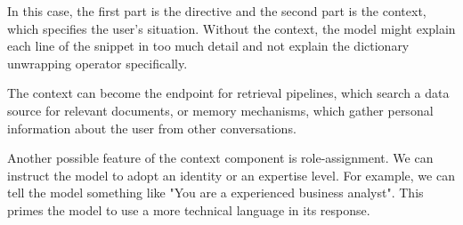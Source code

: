 In this case, the first part is the directive and the second part is the context, which specifies the user's situation.
Without the context, the model might explain each line of the snippet in too much detail and not explain the dictionary unwrapping operator specifically.

The context can become the endpoint for retrieval pipelines, which search a data source for 
relevant documents, or memory mechanisms, which gather personal information about the user from other conversations. 

Another possible feature of the context component is role-assignment. 
We can instruct the model to adopt an identity or an expertise level.
For example, we can tell the model something like "You are a experienced business analyst".
This primes the model to use a more technical language in its response.

